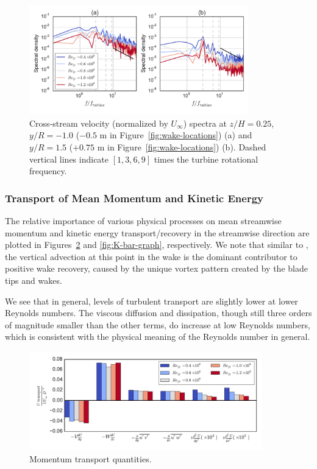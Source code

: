 \documentclass[energies,article,accept,moreauthors,pdftex,12pt,a4paper]{mdpi}
\begin{document}
\begin{figure}[ht!]
\centering

\includegraphics[width=0.85\textwidth]{figures/wake_spectra}

\caption{Cross-stream velocity (normalized by $U_\infty$) spectra at $z/H=0.25$,
    $y/R=-1.0$ ($-0.5$ m in Figure~\ref{fig:wake-locations}) (a) and $y/R=1.5$
    ($+0.75$ m in Figure~\ref{fig:wake-locations}) (b). Dashed vertical lines
    indicate $[1, 3, 6, 9]$ times the turbine rotational frequency.}

\label{fig:wake-spectra}
\end{figure}



\subsubsection{Transport of Mean Momentum and Kinetic Energy}

The relative importance of various physical processes on mean streamwise
momentum and kinetic energy transport/recovery in the streamwise direction are
plotted in Figures~\ref{fig:mom-bar-graph} and \ref{fig:K-bar-graph},
respectively. We note that similar to \cite{Bachant2015-JoT}, the vertical
advection at this point in the wake is the dominant contributor to positive wake
recovery, caused by the unique vortex pattern created by the blade tips and
wakes.

We see that in general, levels of turbulent transport are slightly lower at
lower Reynolds numbers. The viscous diffusion and dissipation, though still
three orders of magnitude smaller than the other terms, do increase at low
Reynolds numbers, which is consistent with the physical meaning of the Reynolds
number
in general.


\begin{figure}[ht!]
\centering
\includegraphics[width=0.9\textwidth]{figures/mom_bar_graph}
\caption{Momentum transport quantities.}
\label{fig:mom-bar-graph}
\end{figure}
\end{document}
